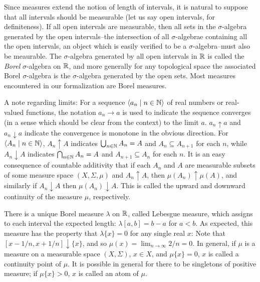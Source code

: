 \documentclass{article}
\theoremstyle{definition}
\newcommand{\bldseq}[2]{\langle{#1}\mid{#2}\rangle}
\begin{document}
Since measures extend the notion of length of intervals, it is natural to suppose that all intervals should be measurable (let us say open intervals, for definiteness). If all open intervals are measurable, then all sets in the $\sigma$-algebra generated by the open intervals--the intersection of all $\sigma$-algebrae containing all the open intervals, an object which is easily verified to be a $\sigma$-algebra--must also be meaurable. The $\sigma$-algebra generated by all open intervals in $\mathbb{R}$ is called the {\em Borel} $\sigma$-algebra on $\mathbb{R}$, and more generally for any topological space the associated Borel $\sigma$-algebra is the $\sigma$-algebra generated by the open sets. Most measures encountered in our formalization are Borel measures.

A note regarding limits: For a sequence $\bldseq{a_n}{n \in \N}$ of real numbers or real-valued functions, the notation $a_n \rightarrow a$ is used to indicate the sequence converges (in a sense which should be clear from the context) to the limit $a$. $a_n \uparrow a$ and $a_n \downarrow a$ indicate the convergence is monotone in the obvious direction. For $\bldseq{A_n}{n \in \N}$, $A_n \uparrow A$ indicates $\bigcup_{n \in \mathbb{N}} A_n = A$ and $A_n \subseteq A_{n+1}$ for each $n$, while $A_n \downarrow A$ indicates $\bigcap_{n \in \mathbb{N}} A_n = A$ and $A_{n+1} \subseteq A_n$ for each $n$. It is an easy consequence of countable additivity that if each $A_n$ and $A$ are measurable subsets of some measure space $(X, \Sigma, \mu)$ and $A_n \uparrow A$, then $\mu(A_n) \uparrow \mu(A)$, and similarly if $A_n \downarrow A$ then $\mu(A_n) \downarrow A$. This is called the upward and downward continuity of the measure $\mu$, respectively.

There is a unique Borel measure $\lambda$ on $\mathbb{R}$, called Lebesgue measure, which assigns to each interval the expected length: $\lambda [a,b] = b - a$ for $a < b$. As expected, this measure has the property that $\lambda \{x\} = 0$ for any single real $x$: Note that $[x - 1/n, x + 1/n] \downarrow \{x\}$, and so $\mu(x) = \lim_{n \rightarrow \infty} 2/n = 0$. In general, if $\mu$ is a measure on a measurable space $(X, \Sigma)$, $x \in X$, and $\mu \{x\} = 0$, $x$ is called a continuity point of $\mu$. It is possible in general for there to be singletons of positive measure; if $\mu \{x\} > 0$, $x$ is called an atom of $\mu$.

\medskip
\end{document}
